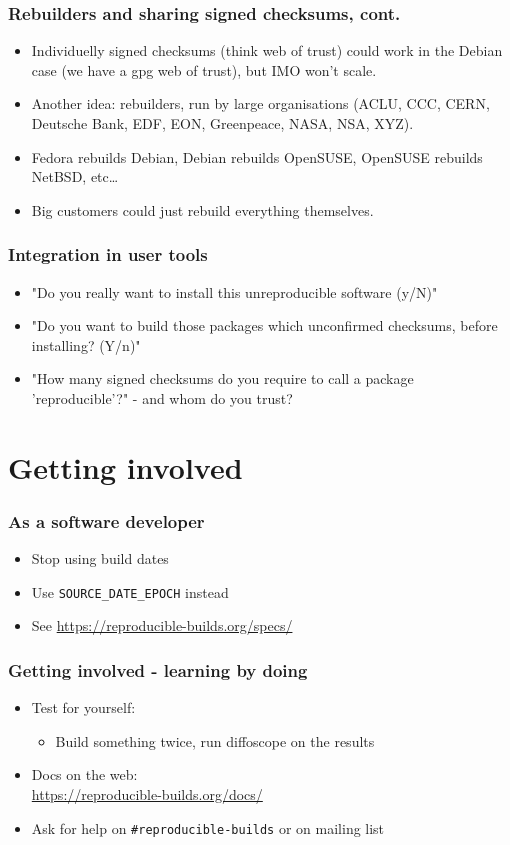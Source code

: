 \documentclass[14pt,aspectratio=169]{beamer}
\begin{document}
\begin{frame}
 \frametitle{Rebuilders and sharing signed checksums, cont.}
 \begin{itemize}
  \item Individuelly signed checksums (think web of trust) could work in the
  Debian case (we have a gpg web of trust), but IMO won't scale.
  \item { Another idea: rebuilders, run by large organisations
  (ACLU, CCC, CERN, Deutsche Bank, EDF, EON, Greenpeace, NASA, NSA, XYZ).}
  \item Fedora rebuilds Debian, Debian rebuilds OpenSUSE, OpenSUSE rebuilds
  NetBSD, etc…
  \item Big customers could just rebuild everything themselves.
 \end{itemize}
\end{frame}


\begin{frame}
 \frametitle{Integration in user tools}
 \begin{itemize}
  \item "Do you really want to install this unreproducible software (y/N)"
  \item<2-3> "Do you want to build those packages which unconfirmed checksums,
  before installing? (Y/n)"
  \item<3>{ "How many signed checksums do you require to call a package
  'reproducible'?" - and whom do you trust?}
 \end{itemize}
\end{frame}


\section{Getting involved}

\begin{frame}
 \frametitle{As a software developer}
 \begin{itemize}
  \item Stop using build dates
  \item Use \texttt{SOURCE\_DATE\_EPOCH} instead
  \item See \url{https://reproducible-builds.org/specs/}
 \end{itemize}
\end{frame}

\begin{frame}
 \frametitle{Getting involved - learning by doing}

 \begin{itemize}
  \item Test for yourself:
   \begin{itemize}
    \item Build something twice, run diffoscope on the results
   \end{itemize}
  \item Docs on the web: \\
    \small{\url{https://reproducible-builds.org/docs/}} \\
  \item Ask for help on \texttt{\#reproducible-builds} or on mailing list
 \end{itemize}
\end{frame}
\end{document}
